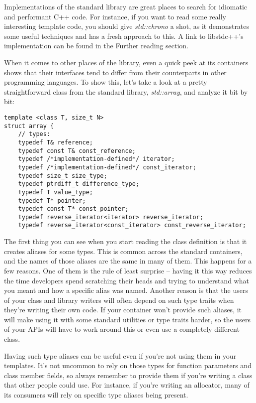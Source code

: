 
Implementations of the standard library are great places to search for idiomatic and performant C++ code. For instance, if you want to read some really interesting template code, you should give \textit{std::chrono} a shot, as it demonstrates some useful techniques and has a fresh approach to this. A link to libstdc++'s implementation can be found in the Further reading section.

When it comes to other places of the library, even a quick peek at its containers shows that their interfaces tend to differ from their counterparts in other programming languages. To show this, let's take a look at a pretty straightforward class from the standard library, \textit{std::array}, and analyze it bit by bit:


\begin{lstlisting}[style=styleCXX]
template <class T, size_t N>
struct array {
	// types:
	typedef T& reference;
	typedef const T& const_reference;
	typedef /*implementation-defined*/ iterator;
	typedef /*implementation-defined*/ const_iterator;
	typedef size_t size_type;
	typedef ptrdiff_t difference_type;
	typedef T value_type;
	typedef T* pointer;
	typedef const T* const_pointer;
	typedef reverse_iterator<iterator> reverse_iterator;
	typedef reverse_iterator<const_iterator> const_reverse_iterator;
\end{lstlisting}

The first thing you can see when you start reading the class definition is that it creates aliases for some types. This is common across the standard containers, and the names of those aliases are the same in many of them. This happens for a few reasons. One of them is the rule of least surprise – having it this way reduces the time developers spend scratching their heads and trying to understand what you meant and how a specific alias was named. Another reason is that the users of your class and library writers will often depend on such type traits when they're writing their own code. If your container won't provide such aliases, it will make using it with some standard utilities or type traits harder, so the users of your APIs will have to work around this or even use a completely different class.

Having such type aliases can be useful even if you're not using them in your templates. It's not uncommon to rely on those types for function parameters and class member fields, so always remember to provide them if you're writing a class that other people could use. For instance, if you're writing an allocator, many of its consumers will rely on specific type aliases being present.

